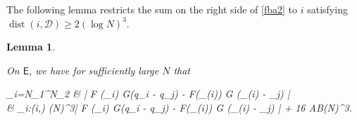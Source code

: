 \documentclass{amsart}
\numberwithin{equation}{section}
\DeclareMathOperator{\dist}{dist}
\newtheorem{lem}[thm]{Lemma}
\theoremstyle{remark}
\theoremstyle{definition}
\begin{document}
	\noindent The following lemma restricts the sum on the right side of \eqref{fba2} to $i$ satisfying $\dist (i, \mathcal{D}) \ge 2(\log N)^3$. 
	
	\begin{lem} 
		
		\label{dflambdaigestimate}
		
		On $\mathsf{E}$, we have for sufficiently large $N$ that
		\begin{flalign}
			\label{fba3}
			\begin{aligned}  
				\displaystyle\sum_{i=N_1}^{N_2} & \big| F (\Lambda_i) \cdot G(q_{i} - q_{j}) - F(\tilde{\Lambda}_{\psi(i)}) \cdot G (\tilde{q}_{\psi(i)} -  _{j}) \big| \\
				& \le \displaystyle\sum_{i:\dist(i,)  (\log N)^3}\big| F (\Lambda_i) \cdot G(q_{i} - q_{j}) - F(\tilde{\Lambda}_{\psi(i)}) \cdot G (\tilde{q}_{\psi(i)} -  _{j}) \big| + 16 AB(\log N)^3.
			\end{aligned} 
		\end{flalign}
		
	\end{lem} 
	
\end{document}

